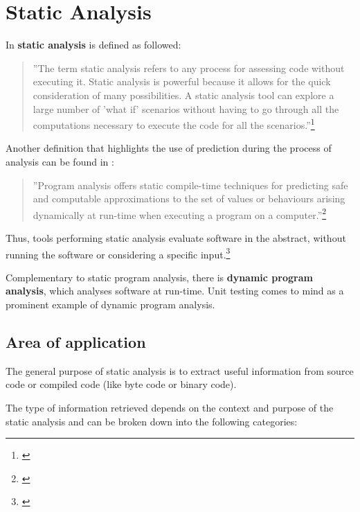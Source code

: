 \chapter{Static Analysis}
\label{chap:StaticAnalysis}

In  \textbf{static analysis} is defined as followed:

\begin{quotation}
''The term static analysis refers to any process for assessing code without
executing it. Static analysis is powerful because it allows for the quick consideration of many possibilities. A static analysis tool can explore a large number of 'what if' scenarios without having to go through all the computations
necessary to execute the code for all the scenarios.''\footnote{\citep[3]{SecureProgramming}}
\end{quotation}

Another definition that highlights the use of prediction during the process of analysis can be found in :

\begin{quotation}
''Program analysis offers static compile-time techniques for predicting safe and computable approximations to the set of values or behaviours arising dynamically at run-time when executing a program on a computer.''\footnote{\citep[1]{ProgramAnalysis}}
\end{quotation}

Thus, tools performing static analysis evaluate software in the abstract, without running the software or considering a specific input.\footnote{\citep[1]{UsingSAToFindBugs}}

Complementary to static program analysis, there is \textbf{dynamic program analysis}, which analyses software at run-time. Unit testing comes to mind as a prominent example of dynamic program analysis.

\newpage
\section{Area of application}
\label{sec:AreaOfApplication}

The general purpose of static analysis is to extract useful information from source code or compiled code (like byte code or binary code).

The type of information retrieved depends on the context and purpose of the static analysis and can be broken down into the following categories:

